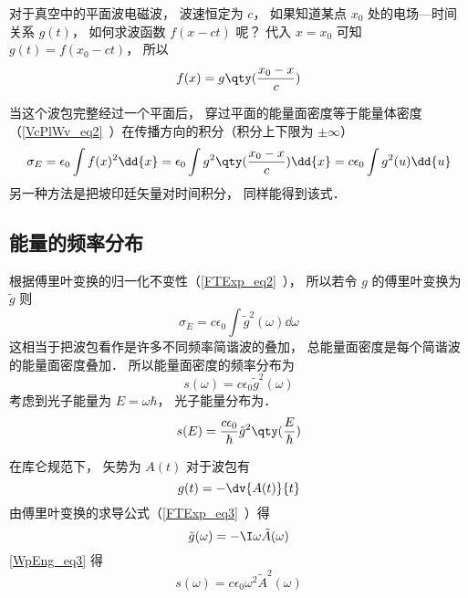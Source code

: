 

对于真空中的平面波电磁波， 波速恒定为 $c$， 如果知道某点 $x_0$ 处的电场—时间关系 $g(t)$， 如何求波函数 $f(x - ct)$ 呢？ 代入 $x = x_0$ 可知 $g(t) = f(x_0 - ct)$， 所以
\begin{equation}
f(x) = g\qty(\frac{x_0 - x}{c})
\end{equation}

当这个波包完整经过一个平面后， 穿过平面的能量面密度等于能量体密度（\autoref{VcPlWv_eq2}~）在传播方向的积分（积分上下限为 $\pm\infty$）
\begin{equation}\label{WpEng_eq1}
\sigma_E = \epsilon_0 \int f(x)^2 \dd{x} = \epsilon_0  \int g^2\qty(\frac{x_0 - x}{c}) \dd{x} = c\epsilon_0 \int g^2(u) \dd{u}
\end{equation}
另一种方法是把坡印廷矢量对时间积分， 同样能得到该式．

\subsection{能量的频率分布}
根据傅里叶变换的归一化不变性（\autoref{FTExp_eq2}~）， 所以若令 $g$ 的傅里叶变换为 $\tilde g$ 则
\begin{equation}
\sigma_E = c\epsilon_0 \int {\tilde g}^2(\omega) \dd{\omega}
\end{equation}
这相当于把波包看作是许多不同频率简谐波的叠加， 总能量面密度是每个简谐波的能量面密度叠加． 所以能量面密度的频率分布为
\begin{equation}\label{WpEng_eq3}
s(\omega) = c\epsilon_0 {\tilde g}^2(\omega)
\end{equation}
考虑到光子能量为 $E = \omega\hbar$， 光子能量分布为．
\begin{equation}\label{WpEng_eq2}
s(E) = \frac{c\epsilon_0}{\hbar} {\tilde g}^2\qty(\frac{E}{\hbar})
\end{equation}

在库仑规范下， 矢势为 $A(t)$ 对于波包有
\begin{equation}
g(t) = -\dv{A(t)}{t}
\end{equation}
由傅里叶变换的求导公式（\autoref{FTExp_eq3}~）得
\begin{equation}
\tilde g(\omega) = -\I \omega \tilde A(\omega)
\end{equation}
\autoref{WpEng_eq3} 得
\begin{equation}
s(\omega) = c\epsilon_0 \omega^2 {\tilde A}^2(\omega)
\end{equation}
